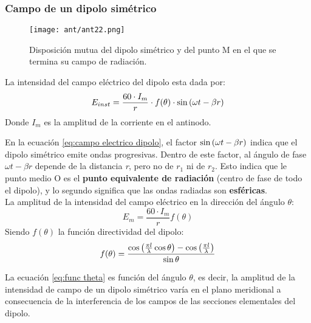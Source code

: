 \documentclass[
	12pt, %
	fleqn, %
	a4paper, %
	oneside, %
]{LegrandOrangeBook}
\begin{document}
\subsubsection{Campo de un dipolo simétrico}
\begin{figure}[H]
\centering
\texttt{[image: ant/ant22.png]}
\caption{Disposición mutua del dipolo simétrico y del punto M en el que se termina su campo de radiación.}
\end{figure}
\begin{definition}
La intensidad del campo eléctrico del dipolo esta dada por:
\begin{equation}
E_{inst}=\frac{60\cdot I_m}{r}\cdot f(\theta)\cdot\sin\left(\omega t-\beta r\right)
\label{eq:campo electrico dipolo}
\end{equation}
Donde $I_m$ es la amplitud de la corriente en el antinodo.
\end{definition}
En la ecuación \ref{eq:campo electrico dipolo}, el factor $\sin\left(\omega t-\beta r\right)$ indica que el dipolo simétrico emite ondas progresivas. Dentro de este factor, al ángulo de fase $\omega t-\beta r$ depende de la distancia \textit{r}, pero no de $r_1$ ni de $r_2$. Esto indica que le punto medio O es el \textbf{punto equivalente de radiación} (centro de fase de todo el dipolo), y lo segundo significa que las ondas radiadas son \textbf{esféricas}.\\
La amplitud de la intensidad del campo eléctrico en la dirección del ángulo $\theta$:
\begin{equation}
E_m=\frac{60\cdot I_m}{r}f(\theta)
\end{equation}
Siendo $f(\theta)$ la función directividad del dipolo:
\begin{equation}
f(\theta)=\frac{\cos\left(\frac{\pi l}{\lambda}\cos\theta\right)-\cos\left(\frac{\pi l}{\lambda}\right)}{\sin\theta}
\label{eq:func theta}
\end{equation}
\begin{corollary}
La ecuación \ref{eq:func theta} es función del ángulo $\theta$, es decir, la amplitud de la intensidad de campo de un dipolo simétrico varía en el plano meridional a consecuencia de la interferencia de los campos de las secciones elementales del dipolo.
\end{corollary}
\end{document}
